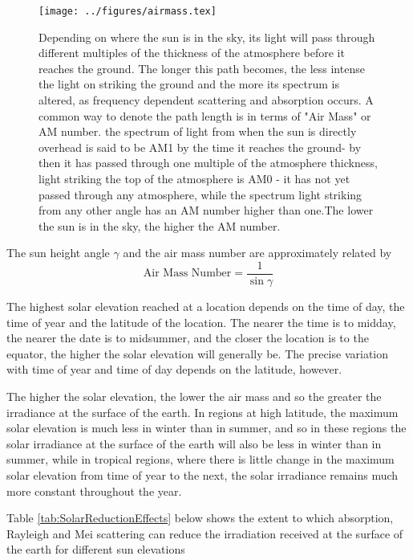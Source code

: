 \documentclass[class=scrartcl, crop=false,parskip=half,]{standalone}
\begin{document}
\begin{figure}
\centering
\texttt{[image: ../figures/airmass.tex]}
\caption{Depending on where the sun is in the sky, its light will pass through different multiples of the thickness of the atmosphere before it reaches the ground. The longer this path becomes, the less intense the light on striking the ground and the more its spectrum is altered, as frequency dependent scattering and absorption occurs. A common way to denote the path length is in terms of "Air Mass" or AM number. the spectrum of light from when the sun is directly overhead is said to be AM1 by the time it reaches the ground- by then it has passed through one multiple of the atmosphere thickness, light striking the top of the atmosphere is AM0 - it has not yet passed through any atmosphere, while the spectrum light striking from any other angle has an AM number higher than one.The lower the sun is in the sky, the higher the AM number.}
\label{fig:airmass}
\end{figure}

The sun height angle $\gamma$ and the air mass number are approximately related by
\begin{equation}
\text{Air\ Mass\ Number} = \dfrac{1}{\sin \gamma }
\label {eq:AMnumber}
\end{equation}

The highest solar elevation reached at a location depends on the time of day,  the time of year and the latitude of the location. The nearer the time is to midday, the nearer the date is to midsummer, and the closer the location is to the equator, the higher the solar elevation will generally be. The precise variation with time of year and time of day depends on the latitude, however.

The higher the solar elevation, the lower the air mass and so the greater the irradiance at the surface of the earth. In regions at high latitude, the maximum solar elevation is much less in winter than in summer, and so in these regions the solar irradiance at the surface of the earth will also be less in winter than in summer, while in tropical regions, where there is little change in the maximum solar elevation from time of year to the next, the solar irradiance remains much more constant throughout the year.

Table \ref{tab:SolarReductionEffects} below shows the extent to which absorption, Rayleigh and Mei scattering can reduce the irradiation received at the surface of the earth for different sun elevations 
\end{document}
